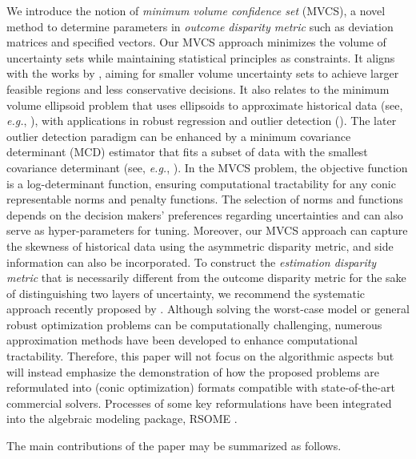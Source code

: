 \documentclass[mnsc, nonblindrev]{informswp}
\newcommand{\1}[1]{\mathds{1}{\left(#1\right)}}
\begin{document}
We introduce the notion of \textit{minimum volume confidence set} (MVCS), a novel method to determine parameters in \emph{outcome disparity metric} such as deviation matrices and specified vectors. Our MVCS approach minimizes the volume of uncertainty sets while maintaining statistical principles as constraints. It aligns with the works by \cite{hong2021learning}, aiming for smaller volume uncertainty sets to achieve larger feasible regions and less conservative decisions.
It also relates to the minimum volume ellipsoid problem that uses ellipsoids to approximate historical data (see, \textit{e.g.}, \citealt{sun2004computation, mittal2022finding}), with applications in robust regression and outlier detection (\citealt{ahipacsaouglu2015fast, van2009minimum}). The later outlier detection paradigm can be enhanced by a minimum covariance determinant (MCD) estimator that fits a subset of data with the smallest covariance determinant (see, \textit{e.g.}, \citealt{rousseeuw2011robust}). In the MVCS problem, the objective function is a log-determinant function, ensuring computational tractability for any conic representable norms and penalty functions. The selection of norms and functions depends on the decision makers' preferences regarding uncertainties and can also serve as hyper-parameters for tuning. 
Moreover, our MVCS approach can capture the skewness of historical data using the asymmetric disparity metric, and side information can also be incorporated. 
To construct the \textit{estimation disparity metric} that is necessarily different from the outcome disparity metric for the sake of distinguishing two layers of uncertainty, we recommend the systematic approach recently proposed by \citealt{Zhu_Xie_Sim_2021joint}. 
Although solving the worst-case model or general robust optimization problems can be computationally challenging, numerous approximation methods have been developed to enhance computational tractability. Therefore, this paper will not focus on the algorithmic aspects but will instead emphasize the demonstration of how the proposed problems are reformulated into (conic optimization) formats compatible with state-of-the-art commercial solvers. Processes of some key reformulations have been integrated into the algebraic modeling package, RSOME \citep{Chen_Sim_Xiong_2020robust,Chen_Xiong_rsome}.

The main contributions of the paper may be summarized as follows.
\end{document}
